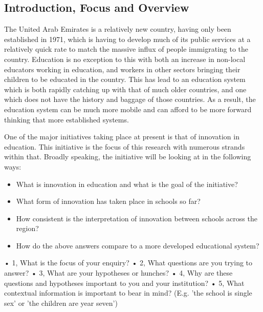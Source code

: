 \subsection{Introduction, Focus and Overview}

The United Arab Emirates is a relatively new country, having only been established in 1971, which is having to develop much of its public services at a relatively quick rate to match the massive influx of people immigrating to the country. Education is no exception to this with both an increase in non-local educators working in education, and workers in other sectors bringing their children to be educated in the country. This has lead to an education system which is both rapidly catching up with that of much older countries, and one which does not have the history and baggage of those countries. As a result, the education system can be much more mobile and can afford to be more forward thinking that more established systems. 

One of the major initiatives taking place at present is that of innovation in education. This initiative is the focus of this research with numerous strands within that. Broadly speaking, the initiative will be looking at in the following ways: 

\begin{itemize}
\item What is innovation in education and what is the goal of the initiative?
\item What form of innovation has taken place in schools so far?
\item How consistent is the interpretation of innovation between schools across the region?
\item How do the above answers compare to a more developed educational system?

\end{itemize}

•	1, What is the focus of your enquiry?
•	2, What questions are you trying to answer?
•	3, What are your hypotheses or hunches?
•	4, Why are these questions and hypotheses important to you and your institution?
•	5, What contextual information is important to bear in mind? (E.g. 'the school is single sex' or 'the children are year seven')